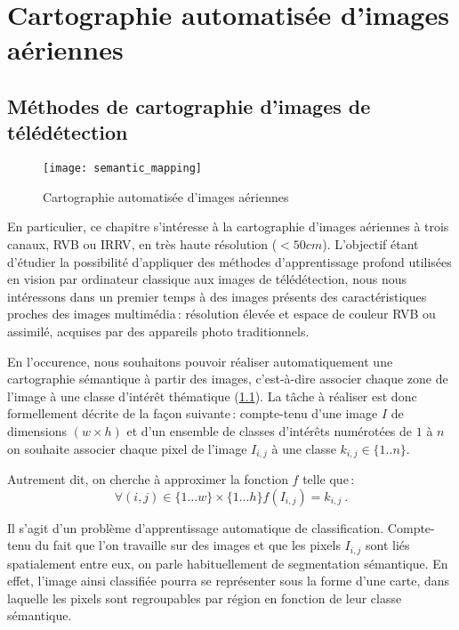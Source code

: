 \chapter{Cartographie automatisée d'images aériennes}
	\citationChap{}{}
	\minitoc
	\newpage


\section{Méthodes de cartographie d'images de télédétection}

\begin{figure}
	\texttt{[image: semantic\_mapping]}
	\caption{Cartographie automatisée d'images aériennes}
	\label{fig:semantic_mapping}
\end{figure}

En particulier, ce chapitre s'intéresse à la cartographie d'images aériennes à trois canaux, \gls{RVB} ou \gls{IRRV}, en très haute résolution ($<50cm$). L'objectif étant d'étudier la possibilité d'appliquer des méthodes d'apprentissage profond utilisées en vision par ordinateur classique aux images de télédétection, nous nous intéressons dans un premier temps à des images présents des caractéristiques proches des images multimédia\,: résolution élevée et espace de couleur \gls{RVB} ou assimilé, acquises par des appareils photo traditionnels.

En l'occurence, nous souhaitons pouvoir réaliser automatiquement une cartographie sémantique à partir des images, c'est-à-dire associer chaque zone de l'image à une classe d'intérêt thématique (\cref{fig:semantic_mapping}). La tâche à réaliser est donc formellement décrite de la façon suivante\,: compte-tenu d'une image $I$ de dimensions $(w\times{}h)$ et d'un ensemble de classes d'intérêts numérotées de $1$ à $n$ on souhaite associer chaque pixel de l'image $I_{i,j}$ à une classe $k_{i,j} \in \{1..n\}$.

Autrement dit, on cherche à approximer la fonction $f$ telle que\,:
$$\forall (i,j) \in \{1\dots{}w\}\times\{1\dots{}h\} f(I_{i,j}) = k_{i,j}~.$$

Il s'agit d'un problème d'apprentissage automatique de classification. Compte-tenu du fait que l'on travaille sur des images et que les pixels $I_{i,j}$ sont liés spatialement entre eux, on parle habituellement de segmentation sémantique. En effet, l'image ainsi classifiée pourra se représenter sous la forme d'une carte, dans laquelle les pixels sont regroupables par région en fonction de leur classe sémantique.

